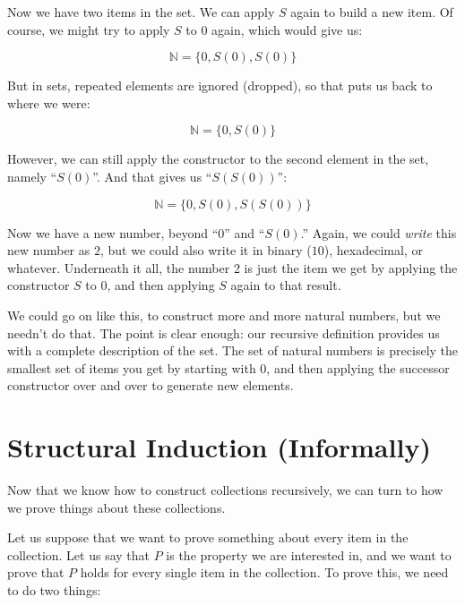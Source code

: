 \documentclass{book}
\numberwithin{equation}{chapter}
\begin{document}
Now we have two items in the set. We can apply $S$ again to build a new item. Of course, we might try to apply $S$ to $0$ again, which would give us:

\begin{equation*}
\mathbb{N} = \{ 0, S(0), S(0) \}
\end{equation*}

\noindent
But in sets, repeated elements are ignored (dropped), so that puts us back to where we were:

\begin{equation*}
\mathbb{N} = \{ 0, S(0) \}
\end{equation*}

\noindent
However, we can still apply the constructor to the second element in the set, namely ``$S(0)$''. And that gives us ``$S(S(0))$'':

\begin{equation*}
\mathbb{N} = \{ 0, S(0), S(S(0)) \}
\end{equation*}

\noindent
Now we have a new number, beyond ``$0$'' and ``$S(0)$.'' Again, we could \textit{write} this new number as $2$, but we could also write it in binary ($10$), hexadecimal, or whatever. Underneath it all, the number 2 is just the item we get by applying the constructor $S$ to $0$, and then applying $S$ again to that result.

We could go on like this, to construct more and more natural numbers, but we needn't do that. The point is clear enough: our recursive definition provides us with a complete description of the set. The set of natural numbers is precisely the smallest set of items you get by starting with 0, and then applying the successor constructor over and over to generate new elements.


\section{Structural Induction (Informally)}

Now that we know how to construct collections recursively, we can turn to how we prove things about these collections.

Let us suppose that we want to prove something about every item in the collection. Let us say that $P$ is the property we are interested in, and we want to prove that $P$ holds for every single item in the collection. To prove this, we need to do two things:
\end{document}
